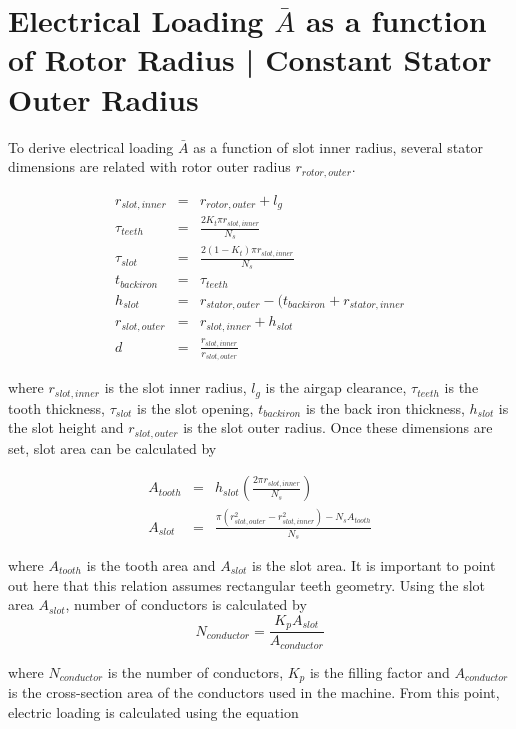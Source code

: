 \documentclass[a4paper, 11pt, titlepage]{article}
\begin{document}
\section{Electrical Loading $\bar{A}$ as a function of Rotor Radius | Constant Stator Outer Radius}
\label{app:torquevsRotorRadius}

To derive electrical loading $\bar{A}$ as a function of slot inner radius, several stator dimensions are related with rotor outer radius $r_{rotor,outer}$.

\begin{eqnarray}
	r_{slot, inner} &=& r_{rotor,outer} + l_g \\
	\tau_{teeth} &=& \frac{2K_t\pi r_{slot,inner}}{N_s} \\
	\tau_{slot} &=& \frac{2(1-K_t)\pi r_{slot,inner}}{N_s} \\
	t_{back iron} &=& \tau_{teeth} \\
	h_{slot} &=& r_{stator,outer}-(t_{back iron}+r_{stator,inner} \\
	r_{slot,outer} &=& r_{slot,inner}+h_{slot} \\
	d &=& \frac{r_{slot,inner}}{r_{slot,outer}}
	\label{eq:machineDimensions}
\end{eqnarray}

where $r_{slot, inner}$ is the slot inner radius, $l_g$ is the airgap clearance, $\tau_{teeth}$ is the tooth thickness, $\tau_{slot}$ is the slot opening, $t_{back iron}$ is the back iron thickness, $h_{slot}$ is the slot height and $r_{slot,outer}$ is the slot outer radius. Once these dimensions are set, slot area can be calculated by

\begin{eqnarray}
	A_{tooth} &=& h_{slot}(\frac{2\pi r_{slot,inner}}{N_s}) \\
	A_{slot} &=& \frac{\pi(r^2_{slot,outer}-r^2_{slot,inner})-N_sA_{tooth}}{N_s}
\end{eqnarray}

where $A_{tooth}$ is the tooth area and $A_{slot}$ is the slot area. It is important to point out here that this relation assumes rectangular teeth geometry.
Using the slot area $A_{slot}$, number of conductors is calculated by
\begin{equation}
	N_{conductor} = \frac{K_pA_{slot}}{A_{conductor}}
\end{equation}

where  $N_{conductor}$ is the number of conductors, $K_p$ is the filling factor and $A_{conductor}$ is the cross-section area of the conductors used in the machine. From this point, electric loading is calculated using the equation
\end{document}
